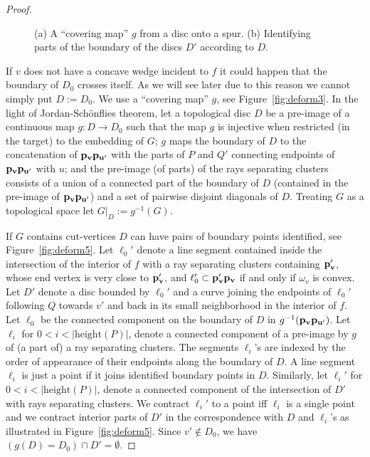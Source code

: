 \documentclass{llncs}
\def\length{\mathrm{height}}
\begin{document}
\begin{proof}
 
 

 \begin{figure}[h]
  \centering
\centering
{}
    	\hspace{10px}
\caption{(a) A ``covering map'' $g$ from a disc onto a spur. (b) Identifying parts of the boundary of the discs $D'$ 
according to $D$.}

\end{figure}
 

  If $v$ does not have a concave wedge incident to $f$ it could happen that the boundary of $D_0$ crosses itself. As we will see later due to this reason we cannot simply put $D:=D_0$.
We use a ``covering map'' $g$, see Figure~\ref{fig:deform3}.
In the light of Jordan-Sch\"onflies theorem,
  let a topological disc $D$ be a pre-image of a continuous  map  $g:D \rightarrow D_0$ such that the map $g$ is injective when restricted (in the target) to the embedding of $G$;
$g$ maps the boundary of $D$ to the concatenation of ${\bf p_{v}}{\bf p_{u'}}$
with the parts of $P$ and $Q'$ connecting endpoints of ${\bf p_{v}}{\bf p_{u'}}$  with $u$;
and the pre-image (of  parts) of the rays separating clusters
 consists of a union of a connected part of the boundary of $D$ 
 (contained in the pre-image of ${\bf p_{v}}{\bf p_{u'}}$) and
a set of pairwise disjoint diagonals of $D$.
Treating $G$ as a topological space let $G|_D:=g^{-1}(G)$.  

 If $G$ contains cut-vertices $D$ can have pairs of boundary points identified, see Figure~\ref{fig:deform5}.
Let $\ell_0'$ denote  a line segment contained inside the intersection of the interior of $f$ with a ray separating clusters containing ${\bf p_v'}$, whose end vertex is very close to ${\bf p_v'}$, and $\ell_0'\subset{\bf p_v'p_v}$ if and only if $\omega_v$ is convex. Let $D'$ denote a disc bounded by $\ell_0'$ and a curve 
joining the endpoints of $\ell_0'$ following $Q$ towards $v'$ and back in its small neighborhood in the interior of $f$.
Let $\ell_0$ be the connected component on the boundary of $D$ in $g^{-1}({\bf p_vp_{u'}})$.
Let $\ell_i$ for $0<i<|\length(P)|$, denote a connected component of a pre-image by $g$ of (a part of) a ray separating clusters. The segments 
$\ell_i$'s are indexed by the order of appearance of their endpoints along the boundary of $D$.
A line segment $\ell_i$ is just a point if it joins identified boundary points in $D$.
Similarly, let $\ell_i'$ for $0<i<|\length(P)|$, denote a connected component of the 
intersection of $D'$ with rays separating clusters.
We contract $\ell_i'$ to a point iff $\ell_i$ is a single point
and we  contract  interior parts of $D'$ in the correspondence with $D$ and $\ell_i$'s as illustrated in Figure~\ref{fig:deform5}. Since $v'\not\in D_0$, we have $(g(D)=D_0)\cap D' = \emptyset$.


\end{proof}
\end{document}
